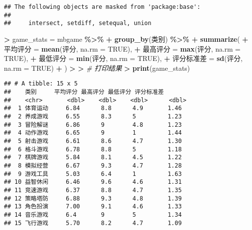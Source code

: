 \documentclass[
]{article}
\newenvironment{Shaded}{\begin{snugshade}}{\end{snugshade}}
\newcommand{\AttributeTok}[1]{\textcolor[rgb]{0.13,0.29,0.53}{#1}}
\newcommand{\CommentTok}[1]{\textcolor[rgb]{0.56,0.35,0.01}{\textit{#1}}}
\newcommand{\ConstantTok}[1]{\textcolor[rgb]{0.56,0.35,0.01}{#1}}
\newcommand{\ErrorTok}[1]{\textcolor[rgb]{0.64,0.00,0.00}{\textbf{#1}}}
\newcommand{\FunctionTok}[1]{\textcolor[rgb]{0.13,0.29,0.53}{\textbf{#1}}}
\newcommand{\NormalTok}[1]{#1}
\newcommand{\OtherTok}[1]{\textcolor[rgb]{0.56,0.35,0.01}{#1}}
\newcommand{\SpecialCharTok}[1]{\textcolor[rgb]{0.81,0.36,0.00}{\textbf{#1}}}
\begin{document}
\begin{verbatim}
## The following objects are masked from 'package:base':
## 
##     intersect, setdiff, setequal, union
\end{verbatim}

\begin{Shaded}
\begin{Highlighting}[]
\SpecialCharTok{\textgreater{}}\NormalTok{ game\_stats }\OtherTok{=}\NormalTok{ mbgame }\SpecialCharTok{\%\textgreater{}\%}
\SpecialCharTok{+}   \FunctionTok{group\_by}\NormalTok{(类别) }\SpecialCharTok{\%\textgreater{}\%}
\SpecialCharTok{+}   \FunctionTok{summarize}\NormalTok{(}
\SpecialCharTok{+}\NormalTok{     平均评分 }\OtherTok{=} \FunctionTok{mean}\NormalTok{(评分, }\AttributeTok{na.rm =} \ConstantTok{TRUE}\NormalTok{),}
\SpecialCharTok{+}\NormalTok{     最高评分 }\OtherTok{=} \FunctionTok{max}\NormalTok{(评分, }\AttributeTok{na.rm =} \ConstantTok{TRUE}\NormalTok{),}
\SpecialCharTok{+}\NormalTok{     最低评分 }\OtherTok{=} \FunctionTok{min}\NormalTok{(评分, }\AttributeTok{na.rm =} \ConstantTok{TRUE}\NormalTok{),}
\SpecialCharTok{+}\NormalTok{     评分标准差 }\OtherTok{=} \FunctionTok{sd}\NormalTok{(评分, }\AttributeTok{na.rm =} \ConstantTok{TRUE}\NormalTok{)}
\SpecialCharTok{+}\NormalTok{   )}
\SpecialCharTok{\textgreater{}} 
\ErrorTok{\textgreater{}} \CommentTok{\# 打印结果}
\ErrorTok{\textgreater{}} \FunctionTok{print}\NormalTok{(game\_stats)}
\end{Highlighting}
\end{Shaded}

\begin{verbatim}
## # A tibble: 15 x 5
##    类别     平均评分 最高评分 最低评分 评分标准差
##    <chr>       <dbl>    <dbl>    <dbl>      <dbl>
##  1 体育运动     6.84      8.8      4.9       1.46
##  2 养成游戏     6.55      8.3      5         1.23
##  3 冒险解谜     6.86      9        4.8       1.23
##  4 动作游戏     6.65      9        1         1.44
##  5 射击游戏     6.61      8.6      4.7       1.30
##  6 格斗游戏     6.78      8.8      5         1.18
##  7 棋牌游戏     5.84      8.1      4.5       1.22
##  8 模拟经营     6.67      9.3      4.7       1.28
##  9 游戏工具     5.03      6.4      1         1.63
## 10 益智休闲     6.46      9.6      4.6       1.31
## 11 竞速游戏     6.37      8.8      4.7       1.35
## 12 策略塔防     6.88      9.3      4.8       1.39
## 13 角色扮演     7.00      9.1      4.6       1.33
## 14 音乐游戏     6.4       9        5         1.34
## 15 飞行游戏     5.70      8.2      4.7       1.09
\end{verbatim}
\end{document}
